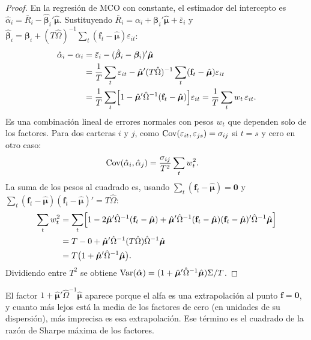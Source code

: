 \begin{proof}
En la regresión de MCO con constante, el estimador del intercepto es
$\hat\alpha_i=\bar R_i-\hat{\boldsymbol\beta}_i'\hat{\boldsymbol\mu}$. Sustituyendo $\bar R_i=\alpha_i+\boldsymbol\beta_i'\hat{\boldsymbol\mu}+\bar\varepsilon_i$
y $\hat{\boldsymbol\beta}_i=\boldsymbol\beta_i+(T\hat\Omega)^{-1}\sum_t(\mathbf f_t-\hat{\boldsymbol\mu})\varepsilon_{it}$:
\begin{align*}
  \hat\alpha_i-\alpha_i &= \bar\varepsilon_i-(\hat{\boldsymbol\beta}_i-\boldsymbol\beta_i)'\hat{\boldsymbol\mu}\\
                        &= \frac1T\sum_t\varepsilon_{it}-\hat{\boldsymbol\mu}'(T\hat\Omega)^{-1}\sum_t(\mathbf f_t-\hat{\boldsymbol\mu})\varepsilon_{it}\\
                        &= \frac1T\sum_t\Bigl[1-\hat{\boldsymbol\mu}'\hat\Omega^{-1}(\mathbf f_t-\hat{\boldsymbol\mu})\Bigr]\varepsilon_{it}
                         = \frac1T\sum_t w_t\,\varepsilon_{it}.
\end{align*}
Es una combinación lineal de errores normales con pesos $w_t$ que dependen solo de los factores. Para dos carteras
$i$ y $j$, como $\operatorname{Cov}(\varepsilon_{it},\varepsilon_{js})=\sigma_{ij}$ si $t=s$ y cero en otro caso:
\begin{align*}
  \operatorname{Cov}(\hat\alpha_i,\hat\alpha_j) &= \frac{\sigma_{ij}}{T^2}\sum_t w_t^2 .
\end{align*}
La suma de los pesos al cuadrado es, usando $\sum_t(\mathbf f_t-\hat{\boldsymbol\mu})=\mathbf 0$ y
$\sum_t(\mathbf f_t-\hat{\boldsymbol\mu})(\mathbf f_t-\hat{\boldsymbol\mu})'=T\hat\Omega$:
\begin{align*}
  \sum_t w_t^2 &= \sum_t\Bigl[1-2\hat{\boldsymbol\mu}'\hat\Omega^{-1}(\mathbf f_t-\hat{\boldsymbol\mu})
                  +\hat{\boldsymbol\mu}'\hat\Omega^{-1}(\mathbf f_t-\hat{\boldsymbol\mu})(\mathbf f_t-\hat{\boldsymbol\mu})'\hat\Omega^{-1}\hat{\boldsymbol\mu}\Bigr]\\
               &= T-0+\hat{\boldsymbol\mu}'\hat\Omega^{-1}(T\hat\Omega)\hat\Omega^{-1}\hat{\boldsymbol\mu}\\
               &= T\bigl(1+\hat{\boldsymbol\mu}'\hat\Omega^{-1}\hat{\boldsymbol\mu}\bigr).
\end{align*}
Dividiendo entre $T^2$ se obtiene $\operatorname{Var}(\hat{\boldsymbol\alpha})=(1+\hat{\boldsymbol\mu}'\hat\Omega^{-1}\hat{\boldsymbol\mu})\Sigma/T$.
\end{proof}

El factor $1+\hat{\boldsymbol\mu}'\hat\Omega^{-1}\hat{\boldsymbol\mu}$ aparece porque el alfa es una extrapolación al punto
$\mathbf f=\mathbf 0$, y cuanto más lejos está la media de los factores de cero (en unidades de su dispersión), más
imprecisa es esa extrapolación. Ese término es el cuadrado de la razón de Sharpe máxima de los factores.

